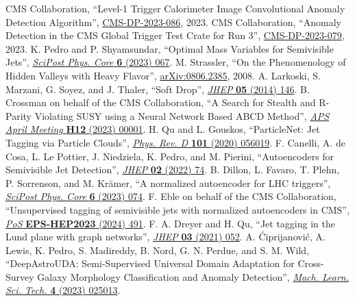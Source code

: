 \begin{thebibliography}{99}
 CMS Collaboration, ``Level-1 Trigger Calorimeter Image Convolutional Anomaly Detection Algorithm'', \href{http://cds.cern.ch/record/2879816}{CMS-DP-2023-086}, 2023.
 CMS Collaboration, ``Anomaly Detection in the CMS Global Trigger Test Crate for Run 3'', \href{http://cds.cern.ch/record/2876546}{CMS-DP-2023-079}, 2023.
 K. Pedro and P. Shyamsundar, ``Optimal Mass Variables for Semivisible Jets'', \href{https://doi.org/10.21468/SciPostPhysCore.6.4.067}{\textit{SciPost Phys. Core} \textbf{6} (2023) 067}.
 M. Strassler, ``On the Phenomenology of Hidden Valleys with Heavy Flavor'', \href{https://arxiv.org/abs/0806.2385}{arXiv:0806.2385}, 2008.
 A. Larkoski, S. Marzani, G. Soyez, and J. Thaler, ``Soft Drop'', \href{https://doi.org/10.1007/JHEP05(2014)146}{\textit{JHEP} \textbf{05} (2014) 146}.
 B. Crossman on behalf of the CMS Collaboration, ``A Search for Stealth and R-Parity Violating SUSY using a Neural Network Based ABCD Method'', \href{https://meetings.aps.org/Meeting/APR23/Session/H12.1}{\textit{APS April Meeting} \textbf{H12} (2023) 00001}.
 H. Qu and L. Gouskos, ``ParticleNet: Jet Tagging via Particle Clouds'', \href{https://doi.org/10.1103/PhysRevD.101.056019}{\textit{Phys. Rev. D} \textbf{101} (2020) 056019}.
 F. Canelli, A. de Cosa, L. Le Pottier, J. Niedziela, K. Pedro, and M. Pierini, ``Autoencoders for Semivisible Jet Detection'', \href{https://doi.org/10.1007/JHEP02(2022)074}{\textit{JHEP} \textbf{02} (2022) 74}.
 B. Dillon, L. Favaro, T. Plehn, P. Sorrenson, and M. Kr\"amer, ``A normalized autoencoder for LHC triggers'', \href{https://doi.org/10.21468/SciPostPhysCore.6.4.074}{\textit{SciPost Phys. Core} \textbf{6} (2023) 074}.
 F. Eble on behalf of the CMS Collaboration, ``Unsupervised tagging of semivisible jets with normalized autoencoders in CMS'', \href{https://doi.org/10.22323/1.449.0491}{\textit{PoS} \textbf{EPS-HEP2023} (2024) 491}.
 F. A. Dreyer and H. Qu, ``Jet tagging in the Lund plane with graph networks'', \href{https://doi.org/10.1007/JHEP03(2021)052}{\textit{JHEP} \textbf{03} (2021) 052}.
 A. \'Ciprijanovi\'c, A. Lewis, K. Pedro, S. Madireddy, B. Nord, G. N. Perdue, and S. M. Wild, ``DeepAstroUDA: Semi-Supervised Universal Domain Adaptation for Cross-Survey Galaxy Morphology Classification and Anomaly Detection'', \href{https://doi.org/10.1088/2632-2153/acca5f}{\textit{Mach. Learn. Sci. Tech.} \textbf{4} (2023) 025013}.

\end{thebibliography}
